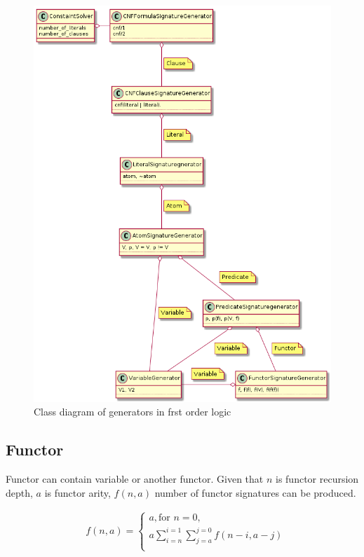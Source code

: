 \begin{figure}[H]
\begin{centering}
  \includegraphics[width=\textwidth]{logic-formula-generator/fol/cnf_signature_generators.png}
  \caption{Class diagram of generators in frst order logic}
\end{centering}
\end{figure}

\subsection{Functor}

Functor can contain variable or another functor.
Given that
$n$ is functor recursion depth,
$a$ is functor arity,
$f(n, a)$ number of functor signatures can be produced.

\begin{align}
	&f(n, a) =
	\begin{cases}
    a, \text{for } n = 0, \\
		a \sum_{i=n}^{i=1} \sum_{j=a}^{j=0} f(n-i,a-j) \\
	\end{cases}
\end{align}

